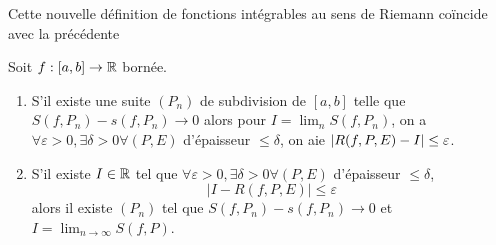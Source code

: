  Cette nouvelle définition de fonctions intégrables au sens de Riemann coïncide avec la précédente
\begin{theoreme}
Soit $f:[a,b]\to \mathbb{R}$ bornée.
\begin{enumerate}
    \item S'il existe une suite $(P_n)$ de subdivision de $[a,b]$ telle que $S(f,P_n)-s(f,P_n) \to 0$ alors pour $I = \lim_nS(f,P_n)$, on a $\forall \varepsilon>0,\exists\delta>0 \forall (P,E)$ d'épaisseur $\le\delta$, on aie $\left| R(f,P,E)-I \right|\le\varepsilon$.
    \item S'il existe $I \in \mathbb{R}$ tel que $\forall \varepsilon>0,\exists\delta>0 \forall (P,E)$ d'épaisseur $\le \delta$, $$|I - R(f,P,E)| \le \varepsilon$$ alors il existe $(P_n)$ tel que $S(f,P_n)-s(f,P_n) \to 0$ et $I = \lim_{n \to \infty} S(f,P)$.
\end{enumerate}
\end{theoreme}

